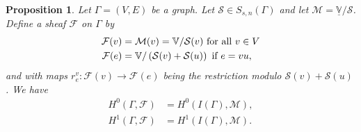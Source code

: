\documentclass{article}
\newtheorem{proposition}[theorem]{Proposition}
\theoremstyle{definition}
\theoremstyle{remark}
\begin{document}
\begin{proposition}\label{prop: F from M}
    Let $\Gamma=(V, E)$ be a graph. Let $\mathcal{S} \in S_{s,n}(\Gamma)$ and let $\mathcal{M} = \underline{\mathbb{V}}/\mathcal{S}$. Define a sheaf $\mathcal{F}$ on $\Gamma$ by
    \begin{align*}
        \mathcal{F}(v) &= \mathcal{M}(v) = \mathbb{V}/\mathcal{S}(v) \textup{ for all }v\in V\\
        \mathcal{F}(e) &= \mathbb{V}/\left( \mathcal{S}(v) +\mathcal{S}(u)\right)\textup{ if } e = vu,
    \end{align*}
    and with maps $r^{v}_{e}:\mathcal{F}(v)\rightarrow \mathcal{F}(e)$ being the restriction modulo $\mathcal{S}(v) +\mathcal{S}(u)$.
    We have
        \begin{align*}
        H^{0}(\Gamma, \mathcal{F})&= H^{0}(I(\Gamma), \mathcal{M}),\\
        H^{1}(\Gamma, \mathcal{F})&= H^{1}(I(\Gamma),  \mathcal{M}).
    \end{align*}
\end{proposition}
\end{document}
